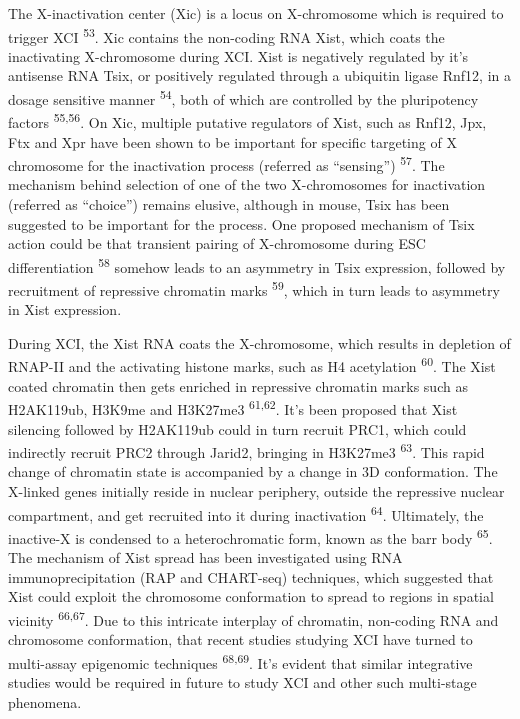 \documentclass[11pt,twoside]{MPIthesis}
\theoremstyle{definition}
\theoremstyle{definition}
\theoremstyle{definition}
\theoremstyle{remark}
\begin{document}
The X-inactivation center (Xic) is a locus on X-chromosome which is
required to trigger XCI \textsuperscript{53}. Xic contains the
non-coding RNA Xist, which coats the inactivating X-chromosome during
XCI. Xist is negatively regulated by it's antisense RNA Tsix, or
positively regulated through a ubiquitin ligase Rnf12, in a dosage
sensitive manner \textsuperscript{54}, both of which are controlled by
the pluripotency factors \textsuperscript{55,56}. On Xic, multiple
putative regulators of Xist, such as Rnf12, Jpx, Ftx and Xpr have been
shown to be important for specific targeting of X chromosome for the
inactivation process (referred as ``sensing'') \textsuperscript{57}. The
mechanism behind selection of one of the two X-chromosomes for
inactivation (referred as ``choice'') remains elusive, although in
mouse, Tsix has been suggested to be important for the process. One
proposed mechanism of Tsix action could be that transient pairing of
X-chromosome during ESC differentiation \textsuperscript{58} somehow
leads to an asymmetry in Tsix expression, followed by recruitment of
repressive chromatin marks \textsuperscript{59}, which in turn leads to
asymmetry in Xist expression.

During XCI, the Xist RNA coats the X-chromosome, which results in
depletion of RNAP-II and the activating histone marks, such as H4
acetylation \textsuperscript{60}. The Xist coated chromatin then gets
enriched in repressive chromatin marks such as H2AK119ub, H3K9me and
H3K27me3 \textsuperscript{61,62}. It's been proposed that Xist silencing
followed by H2AK119ub could in turn recruit PRC1, which could indirectly
recruit PRC2 through Jarid2, bringing in H3K27me3 \textsuperscript{63}.
This rapid change of chromatin state is accompanied by a change in 3D
conformation. The X-linked genes initially reside in nuclear periphery,
outside the repressive nuclear compartment, and get recruited into it
during inactivation \textsuperscript{64}. Ultimately, the inactive-X is
condensed to a heterochromatic form, known as the barr body
\textsuperscript{65}. The mechanism of Xist spread has been investigated
using RNA immunoprecipitation (RAP and CHART-seq) techniques, which
suggested that Xist could exploit the chromosome conformation to spread
to regions in spatial vicinity \textsuperscript{66,67}. Due to this
intricate interplay of chromatin, non-coding RNA and chromosome
conformation, that recent studies studying XCI have turned to
multi-assay epigenomic techniques \textsuperscript{68,69}. It's evident
that similar integrative studies would be required in future to study
XCI and other such multi-stage phenomena.
\end{document}
